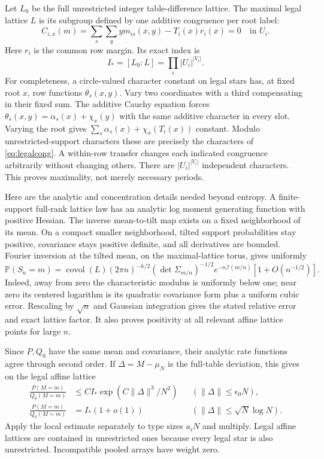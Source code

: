 \documentclass[11pt]{article}
\newcommand{\Prob}{\mathbb P}
\newcommand{\covol}{\operatorname{covol}}
\begin{document}
Let $L_0$ be the full unrestricted integer table-difference lattice. The maximal legal lattice $L$ is its subgroup defined by one additive congruence per root label:
\begin{equation}\label{eq:legalcong}
 C_{i,x}(m)=\sum_s\sum_y y m_{is}(x,y)-T_i(x)r_i(x)=0
 \quad\text{in }U_i.
\end{equation}
Here $r_i$ is the common row margin. Its exact index is
\begin{equation}\label{eq:index}
 I_*=[L_0:L]=\prod_i|U_i|^{|V_i|}.
\end{equation}
For completeness, a circle-valued character constant on legal stars has, at fixed root $x$, row functions $\theta_s(x,y)$. Vary two coordinates with a third compensating in their fixed sum. The additive Cauchy equation forces $\theta_s(x,y)=\alpha_s(x)+\chi_x(y)$ with the same additive character in every slot. Varying the root gives $\sum_s\alpha_s(x)+\chi_x(T_i(x))$ constant. Modulo unrestricted-support characters these are precisely the characters of \eqref{eq:legalcong}. A within-row transfer changes each indicated congruence arbitrarily without changing others. There are $|U_i|^{|V_i|}$ independent characters. This proves maximality, not merely necessary periods.

Here are the analytic and concentration details needed beyond entropy. A finite-support full-rank lattice law has an analytic log moment generating function with positive Hessian. The inverse mean-to-tilt map exists on a fixed neighborhood of its mean. On a compact smaller neighborhood, tilted support probabilities stay positive, covariance stays positive definite, and all derivatives are bounded. Fourier inversion at the tilted mean, on the maximal-lattice torus, gives uniformly
\[
 \Prob(S_n=m)=\covol(L)(2\pi n)^{-h/2}
 (\det\Sigma_{m/n})^{-1/2}e^{-n\mathcal I(m/n)}
 [1+O(n^{-1/2})].
\]
Indeed, away from zero the characteristic modulus is uniformly below one; near zero its centered logarithm is its quadratic covariance form plus a uniform cubic error. Rescaling by $\sqrt n$ and Gaussian integration gives the stated relative error and exact lattice factor. It also proves positivity at all relevant affine lattice points for large $n$.

Since $P,Q_0$ have the same mean and covariance, their analytic rate functions agree through second order. If $\Delta=M-\mu_N$ is the full-table deviation, this gives on the legal affine lattice
\begin{align}
 \frac{P(M=m)}{Q_0(M=m)}&\le C I_*\exp(C\|\Delta\|^3/N^2)
                  &&(\|\Delta\|\le\epsilon_0N),\label{eq:cubic}\\
 \frac{P(M=m)}{Q_0(M=m)}&=I_*(1+o(1))
                  &&(\|\Delta\|\le\sqrt N\log N).
 \label{eq:logratio}
\end{align}
Apply the local estimate separately to type sizes $a_iN$ and multiply. Legal affine lattices are contained in unrestricted ones because every legal star is also unrestricted. Incompatible pooled arrays have weight zero.
\end{document}
